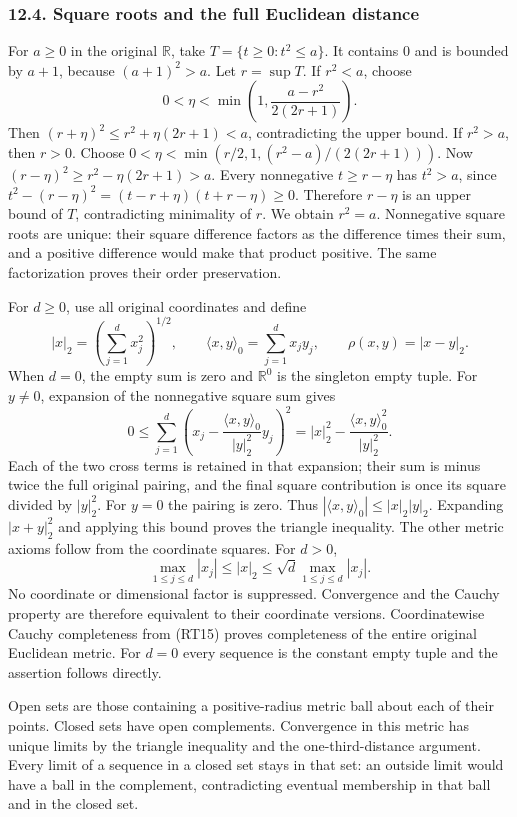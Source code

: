 \documentclass[
  11pt,
]{article}
\begin{document}
\subsubsection{12.4. Square roots and the full Euclidean
distance}\label{square-roots-and-the-full-euclidean-distance}

For \(a\ge0\) in the original \(\mathbb R\), take
\(T=\{t\ge0:t^2\le a\}\). It contains \(0\) and is bounded by \(a+1\),
because \((a+1)^2>a\). Let \(r=\sup T\). If \(r^2<a\), choose \[
0<\eta<\min\left(1,\frac{a-r^2}{2(2r+1)}\right).
\tag{RT18}
\] Then \((r+\eta)^2\le r^2+\eta(2r+1)<a\), contradicting the upper
bound. If \(r^2>a\), then \(r>0\). Choose
\(0<\eta<\min(r/2,1,(r^2-a)/(2(2r+1)))\). Now
\((r-\eta)^2\ge r^2-\eta(2r+1)>a\). Every nonnegative \(t\ge r-\eta\)
has \(t^2>a\), since \(t^2-(r-\eta)^2=(t-r+\eta)(t+r-\eta)\ge0\).
Therefore \(r-\eta\) is an upper bound of \(T\), contradicting
minimality of \(r\). We obtain \(r^2=a\). Nonnegative square roots are
unique: their square difference factors as the difference times their
sum, and a positive difference would make that product positive. The
same factorization proves their order preservation.

For \(d\ge0\), use all original coordinates and define \[
|x|_2=\left(\sum_{j=1}^d x_j^2\right)^{1/2},\qquad
\langle x,y\rangle_0=\sum_{j=1}^d x_jy_j,\qquad
\rho(x,y)=|x-y|_2.
\tag{RT19}
\] When \(d=0\), the empty sum is zero and \(\mathbb R^0\) is the
singleton empty tuple. For \(y\ne0\), expansion of the nonnegative
square sum gives \[
0\le\sum_{j=1}^d\left(x_j-\frac{\langle x,y\rangle_0}{|y|_2^2}y_j\right)^2
=|x|_2^2-\frac{\langle x,y\rangle_0^2}{|y|_2^2}.
\tag{RT20}
\] Each of the two cross terms is retained in that expansion; their sum
is minus twice the full original pairing, and the final square
contribution is once its square divided by \(|y|_2^2\). For \(y=0\) the
pairing is zero. Thus \(|\langle x,y\rangle_0|\le |x|_2|y|_2\).
Expanding \(|x+y|_2^2\) and applying this bound proves the triangle
inequality. The other metric axioms follow from the coordinate squares.
For \(d>0\), \[
\max_{1\le j\le d}|x_j|\le |x|_2
\le \sqrt d\max_{1\le j\le d}|x_j|.
\tag{RT21}
\] No coordinate or dimensional factor is suppressed. Convergence and
the Cauchy property are therefore equivalent to their coordinate
versions. Coordinatewise Cauchy completeness from (RT15) proves
completeness of the entire original Euclidean metric. For \(d=0\) every
sequence is the constant empty tuple and the assertion follows directly.

Open sets are those containing a positive-radius metric ball about each
of their points. Closed sets have open complements. Convergence in this
metric has unique limits by the triangle inequality and the
one-third-distance argument. Every limit of a sequence in a closed set
stays in that set: an outside limit would have a ball in the complement,
contradicting eventual membership in that ball and in the closed set.
\end{document}
